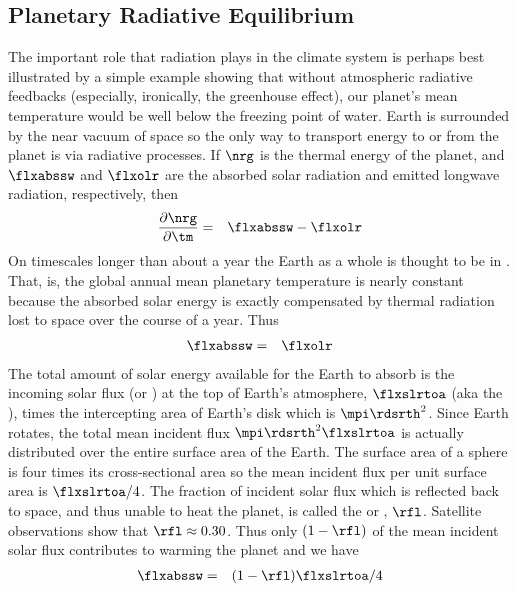 \documentclass[12pt]{article}
\begin{document}
\subsection{Planetary Radiative Equilibrium}\label{sxn:nrg_bln}
The important role that radiation plays in the climate system
is perhaps best illustrated by a simple example showing that
without atmospheric radiative feedbacks (especially, ironically, 
the greenhouse effect), our planet's mean temperature would be
well below the freezing point of water.
Earth is surrounded by the near vacuum of space so the only way to
transport energy to or from the planet is via radiative processes.
If $\nrg$ is the thermal energy of the planet, and $\flxabssw$ and
$\flxolr$ are the absorbed solar radiation and emitted longwave
radiation, respectively, then
\begin{eqnarray}
\frac{\partial \nrg}{\partial \tm} & = & \flxabssw - \flxolr
\label{eqn:nrg_bln_dfn}
\end{eqnarray}
On timescales longer than about a year the Earth as a whole is thought
to be in .
That, is, the global annual mean planetary temperature is nearly
constant because the absorbed solar energy is exactly compensated by
thermal radiation lost to space over the course of a year.
Thus
\begin{eqnarray}
\flxabssw & = & \flxolr
\label{eqn:rdn_eqm_dfn}
\end{eqnarray}
The total amount of solar energy available for the Earth to absorb is
the incoming solar flux (or ) at the top of Earth's
atmosphere, $\flxslrtoa$ (aka the ), times the
intercepting area of Earth's disk which is $\mpi \rdsrth^{2}$.
Since Earth rotates, the total mean incident flux $\mpi \rdsrth^{2}
\flxslrtoa$ is actually distributed over the entire surface area of the
Earth. 
The surface area of a sphere is four times its cross-sectional area
so the mean incident flux per unit surface area is $\flxslrtoa / 4$.
The fraction of incident solar flux which is reflected back to space,
and thus unable to heat the planet, is called the
 or , $\rfl$.
Satellite observations show that $\rfl \approx 0.30$.
Thus only $(1 - \rfl)$ of the mean incident solar flux contributes
to warming the planet and we have
\begin{eqnarray}
\flxabssw & = & (1 - \rfl) \flxslrtoa / 4
\label{eqn:flx_abs_sw_dfn}
\end{eqnarray}
\end{document}
